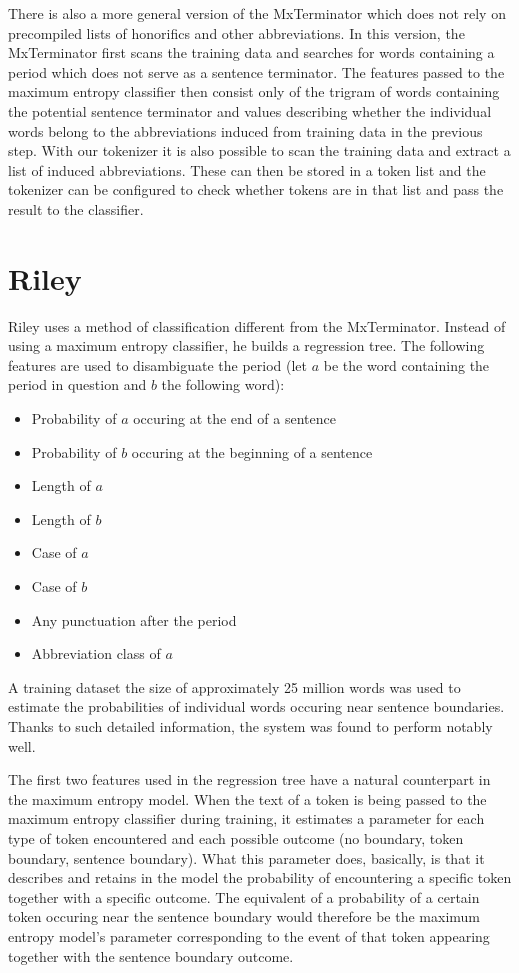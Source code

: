 There is also a more general version of the MxTerminator which does not rely on
precompiled lists of honorifics and other abbreviations. In this version, the
MxTerminator first scans the training data and searches for words containing a
period which does not serve as a sentence terminator. The features passed to
the maximum entropy classifier then consist only of the trigram of words
containing the potential sentence terminator and values describing whether the
individual words belong to the abbreviations induced from training data in the
previous step. With our tokenizer it is also possible to scan the training data
and extract a list of induced abbreviations. These can then be stored in a
token list and the tokenizer can be configured to check whether tokens are in
that list and pass the result to the classifier.

\section{Riley}
\label{sec:survey-riley}

Riley uses a method of classification different from the MxTerminator. Instead
of using a maximum entropy classifier, he builds a regression tree. The
following features are used to disambiguate the period (let $a$ be the word
containing the period in question and $b$ the following word):

\begin{itemize}
  \item Probability of $a$ occuring at the end of a sentence
  \item Probability of $b$ occuring at the beginning of a sentence
  \item Length of $a$
  \item Length of $b$
  \item Case of $a$
  \item Case of $b$
  \item Any punctuation after the period
  \item Abbreviation class of $a$
\end{itemize}

A training dataset the size of approximately 25 million words was used to
estimate the probabilities of individual words occuring near sentence
boundaries. Thanks to such detailed information, the system was found to
perform notably well.

The first two features used in the regression tree have a natural counterpart
in the maximum entropy model. When the text of a token is being passed to the
maximum entropy classifier during training, it estimates a parameter for each
type of token encountered and each possible outcome (no boundary, token
boundary, sentence boundary). What this parameter does, basically, is that it
describes and retains in the model the probability of encountering a specific
token together with a specific outcome. The equivalent of a probability of a
certain token occuring near the sentence boundary would therefore be the
maximum entropy model's parameter corresponding to the event of that token
appearing together with the sentence boundary outcome.

